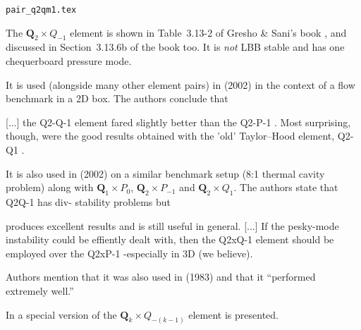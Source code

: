 \begin{flushright} {\tiny {\color{gray} \tt pair\_q2qm1.tex}} \end{flushright}


The ${\bm Q}_2\times Q_{-1}$ element is shown in Table~3.13-2 of Gresho \& Sani's book \cite{grsa}, 
and discussed in Section~3.13.6b of the book too. It is {\it not} LBB stable
and has one chequerboard pressure mode.

It is used (alongside many other element pairs) in \textcite{chgs02} (2002) in the context of 
a flow benchmark in a 2D box. The authors conclude that
\begin{displayquote}
{\color{darkgray}
[...] the Q2-Q-1 element fared
slightly better than the Q2-P-1 . Most surprising, though, were the good results obtained with
the 'old' Taylor–Hood element, Q2-Q1 .}
\end{displayquote}

It is also used in \textcite{grsu02} (2002) on a similar benchmark setup (8:1 thermal 
cavity problem) along with ${\bm Q}_1\times P_0$, ${\bm Q}_2\times P_{-1}$ and 
${\bm Q}_2\times Q_1$. The authors state that Q2Q-1 has div- stability problems
but 
\begin{displayquote}
{\color{darkgray}
produces excellent results and is still useful in general.
[...]
If the pesky-mode instability could be effiently dealt with, then the Q2xQ-1 element
should be employed over the Q2xP-1 -especially in 3D (we believe).}
\end{displayquote}

Authors mention that it was also used in \textcite{dejo83} (1983) and that it ``performed
extremely well.''

In \textcite{zhmu16} a special version of the ${\bm Q}_k \times Q_{-(k-1)}$ element is presented.
